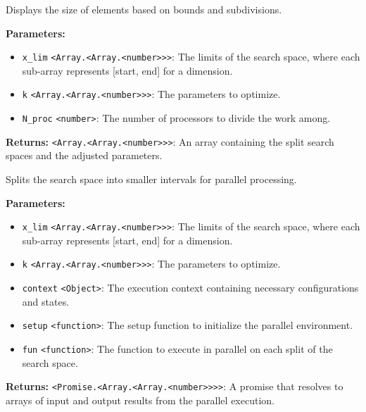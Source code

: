 \documentclass[12pt,a4paper]{article}
\begin{document}
\noindent Displays the size of elements based on bounds and subdivisions.

\vspace{5mm}
\noindent {}


\noindent \textbf{Parameters:}
\begin{itemize}
  \item \texttt{x\_lim} \texttt{<Array.<Array.<number>>>}: The limits of the search space, where each sub-array represents [start, end] for a dimension.
  \item \texttt{k} \texttt{<Array.<Array.<number>>>}: The parameters to optimize.
  \item \texttt{N\_proc} \texttt{<number>}: The number of processors to divide the work among.
\end{itemize}

\noindent \textbf{Returns:} \texttt{<Array.<Array.<number>>>}: An array containing the split search spaces and the adjusted parameters.

\noindent Splits the search space into smaller intervals for parallel processing.

\vspace{5mm}
\noindent {}


\noindent \textbf{Parameters:}
\begin{itemize}
  \item \texttt{x\_lim} \texttt{<Array.<Array.<number>>>}: The limits of the search space, where each sub-array represents [start, end] for a dimension.
  \item \texttt{k} \texttt{<Array.<Array.<number>>>}: The parameters to optimize.
  \item \texttt{context} \texttt{<Object>}: The execution context containing necessary configurations and states.
  \item \texttt{setup} \texttt{<function>}: The setup function to initialize the parallel environment.
  \item \texttt{fun} \texttt{<function>}: The function to execute in parallel on each split of the search space.
\end{itemize}

\noindent \textbf{Returns:} \texttt{<Promise.<Array.<Array.<number>>>>}: A promise that resolves to arrays of input and output results from the parallel execution.
\end{document}
